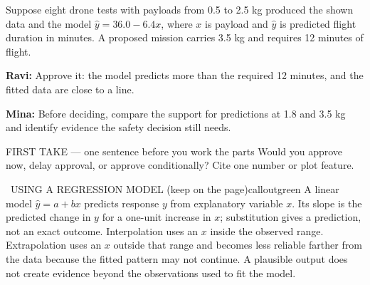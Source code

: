\documentclass[11pt]{article}
\begin{document}
\clearpage
{}

Suppose eight drone tests with payloads from 0.5 to 2.5 kg produced the shown data and the model $\hat y=36.0-6.4x$, where $x$ is payload and $\hat y$ is predicted flight duration in minutes. A proposed mission carries 3.5 kg and requires 12 minutes of flight.\par\smallskip \textbf{Ravi:} Approve it: the model predicts more than the required 12 minutes, and the fitted data are close to a line.\par \textbf{Mina:} Before deciding, compare the support for predictions at 1.8 and 3.5 kg and identify evidence the safety decision still needs.\par
\begin{center}
\end{center}
\begin{firsttakebox}{FIRST TAKE --- one sentence before you work the parts}
Would you approve now, delay approval, or approve conditionally? Cite one number or plot feature.\par
{}
\end{firsttakebox}

\begin{callout}{\IconBook\ USING A REGRESSION MODEL (keep on the page)}{calloutgreen}
A linear model $\hat y=a+bx$ predicts response $y$ from explanatory variable $x$.
Its slope is the predicted change in $y$ for a one-unit increase in $x$; substitution
gives a prediction, not an exact outcome. Interpolation uses an $x$ inside the observed
range. Extrapolation uses an $x$ outside that range and becomes less reliable farther
from the data because the fitted pattern may not continue. A plausible output does not
create evidence beyond the observations used to fit the model.
\end{callout}
\end{document}
